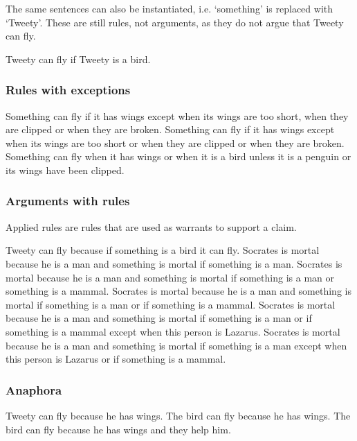 \noindent The same sentences can also be instantiated, i.e. `something' is replaced with `Tweety'. These are still rules, not arguments, as they do not argue that Tweety can fly.
\begin{exe}
\ex\label{e77} Tweety can fly if Tweety is a bird.
\end{exe}

\subsubsection{Rules with exceptions}
\begin{exe}
\ex\label{e80} Something can fly if it has wings except when its wings are too short, when they are clipped or when they are broken.
\ex\label{e81} Something can fly if it has wings except when its wings are too short or when they are clipped or when they are broken.
\ex\label{e82} Something can fly when it has wings or when it is a bird unless it is a penguin or its wings have been clipped. 
\end{exe}

\subsubsection{Arguments with rules}
Applied rules are rules that are used as warrants to support a claim.
\begin{exe}
\ex\label{e90} Tweety can fly because if something is a bird it can fly.
\ex\label{e91} Socrates is mortal because he is a man and something is mortal if something is a man.
\ex\label{e92} Socrates is mortal because he is a man and something is mortal if something is a man or something is a mammal.
\ex\label{e93} Socrates is mortal because he is a man and something is mortal if something is a man or if something is a mammal.
\ex\label{e94} Socrates is mortal because he is a man and something is mortal if something is a man or if something is a mammal except when this person is Lazarus.
\ex\label{e95} Socrates is mortal because he is a man and something is mortal if something is a man except when this person is Lazarus or if something is a mammal.
\end{exe}

\subsubsection{Anaphora}
\begin{exe}
\ex\label{e59} Tweety can fly because he has wings.
\ex\label{e60} The bird can fly because he has wings.
\ex\label{e61} The bird can fly because he has wings and they help him.
\end{exe}

